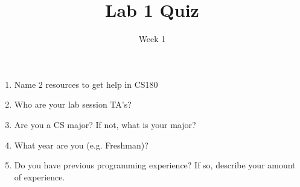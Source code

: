 \documentclass[addpoints]{exam}
\title{Lab 1 Quiz}
\date{Week 1}
\begin{document}
 

\Instructions
\begin{enumerate}

\item {} Name 2 resources to get help in CS180
\newline
\newline
\newline

\item {} Who are your lab session TA's?
\newline
\newline
\newline

\item {} Are you a CS major? If not, what is your major?
\newline
\newline
\newline

\item {} What year are you (e.g. Freshman)?
\newline
\newline
\newline

\item {} Do you have previous programming experience? If so, describe your amount of experience.
\newline
\newline
\newline
\end{enumerate}
\end{document}

